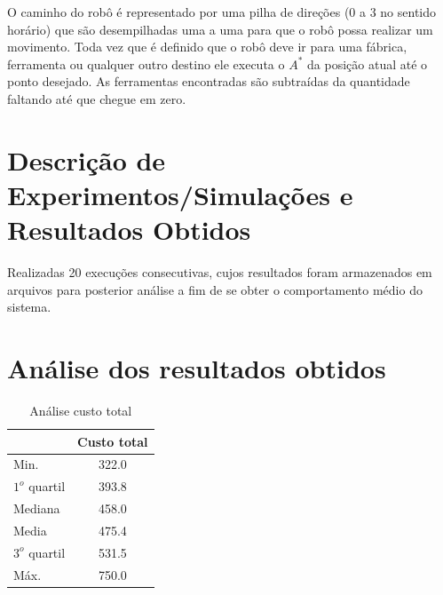 \documentclass[12pt]{article}
\begin{document}
O caminho do robô é representado por uma pilha de direções (0 a 3 no sentido horário) que são desempilhadas uma a uma para que o robô possa realizar um movimento. 
Toda vez que é definido que o robô deve ir para uma fábrica, ferramenta ou qualquer outro destino ele executa o $A^{*}$ da posição atual até o ponto desejado. 
As ferramentas encontradas são subtraídas da quantidade faltando até que chegue em zero. 

\section{Descrição de Experimentos/Simulações e Resultados Obtidos} \label{sec:DescExp}
Realizadas 20 execuções consecutivas, cujos resultados foram armazenados em arquivos para posterior análise a fim de se obter o comportamento médio do sistema.

\section{Análise dos resultados obtidos} \label{sec:Results}
\begin{table}[h]
	\centering
	\begin{tabular}{|l|c|}
	\hline
	& Custo total \\ \hline
	Min. & 322.0 \\ \hline
	$1^{o}$ quartil & 393.8 \\ \hline
	Mediana & 458.0 \\ \hline
	Media & 475.4 \\ \hline
	$3^{o}$ quartil & 531.5 \\ \hline
	Máx. & 750.0 \\ \hline
	\end{tabular}
	\caption{Análise custo total}
	\label{tabela:custo}
\end{table}
\end{document}
